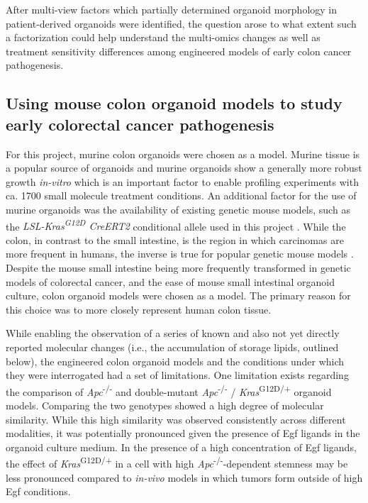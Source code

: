 \begin{flushleft}
After multi-view factors which partially determined organoid morphology in patient-derived organoids were identified, the question arose to what extent such a factorization could help understand the multi-omics changes as well as treatment sensitivity differences among engineered models of early colon cancer pathogenesis.

\subsection{Using mouse colon organoid models to study early colorectal cancer pathogenesis}

For this project, murine colon organoids were chosen as a model. Murine tissue is a popular source of organoids \parencite{satoSingleLgr5Stem2009} and murine organoids show a generally more robust growth \textit{in-vitro} which is an important factor to enable profiling experiments with ca. 1700 small molecule treatment conditions. An additional factor for the use of murine organoids was the availability of existing genetic mouse models, such as the \textit{LSL-Kras\textsuperscript{G12D} CreERT2} conditional allele used in this project \parencite{jacksonAnalysisLungTumor2001}. While the colon, in contrast to the small intestine, is the region in which carcinomas are more frequent in humans, the inverse is true for popular genetic mouse models \parencite{luoMutatedKrasAsp12Promotes2009}. Despite the mouse small intestine being more frequently transformed in genetic models of colorectal cancer, and the ease of mouse small intestinal organoid culture, colon organoid models were chosen as a model. The primary reason for this choice was to more closely represent human colon tissue. 
\smallbreak

While enabling the observation of a series of known and also not yet directly reported molecular changes (i.e., the accumulation of storage lipids, outlined below), the engineered colon organoid models and the conditions under which they were interrogated had a set of limitations. One limitation exists regarding the comparison of \textit{Apc}\textsuperscript{-/-} and double-mutant \textit{Apc}\textsuperscript{-/-} / \textit{Kras}\textsuperscript{G12D/+} organoid models. Comparing the two genotypes showed a high degree of molecular similarity. While this high similarity was observed consistently across different modalities, it was potentially pronounced given the presence of Egf ligands in the organoid culture medium. In the presence of a high concentration of Egf ligands, the effect of \textit{Kras}\textsuperscript{G12D/+} in a cell with high \textit{Apc}\textsuperscript{-/-}-dependent stemness may be less pronounced compared to \textit{in-vivo} models in which tumors form outside of high Egf conditions. 


\end{flushleft}
